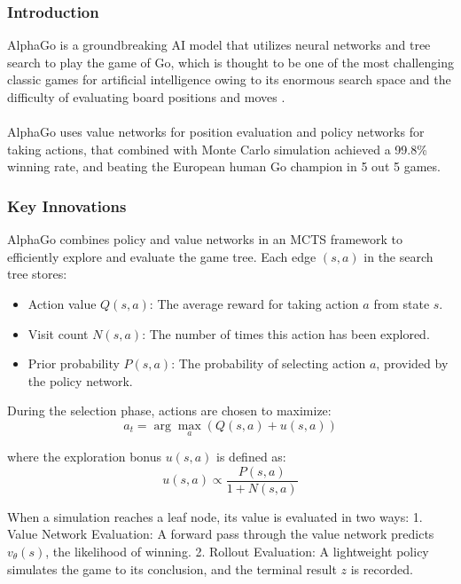 \subsubsection{Introduction}
AlphaGo is a groundbreaking AI model that utilizes neural networks and tree
search to play the game of Go, which is thought to be one of the most
challenging classic games for artificial intelligence owing to its enormous
search space and the difficulty of evaluating board positions and moves
\cite{Silver2016}. \\\\ AlphaGo uses value networks for position evaluation and
policy networks for taking actions, that combined with Monte Carlo simulation
achieved a 99.8\% winning rate, and beating the European human Go champion in 5
out 5 games.

\subsubsection{Key Innovations}

AlphaGo combines policy and value networks in an MCTS framework to efficiently explore and evaluate the game tree. Each edge \( (s, a) \) in the search tree stores:
\begin{itemize}
    \item Action value \( Q(s, a) \): The average reward for taking action \( a \) from
          state \( s \).
    \item Visit count \( N(s, a) \): The number of times this action has been explored.
    \item Prior probability \( P(s, a) \): The probability of selecting action \( a \),
          provided by the policy network.
\end{itemize}

During the selection phase, actions are chosen to maximize:
\begin{equation}
    a_t = \arg\max_a \left( Q(s, a) + u(s, a) \right)
\end{equation}

where the exploration bonus \( u(s, a) \) is defined as:
\begin{equation}
    u(s, a) \propto \frac{P(s, a)}{1 + N(s, a)}
\end{equation}

When a simulation reaches a leaf node, its value is evaluated in two ways: 1.
Value Network Evaluation: A forward pass through the value network predicts \(
v_\theta(s) \), the likelihood of winning. 2. Rollout Evaluation: A lightweight
policy simulates the game to its conclusion, and the terminal result \( z \) is
recorded.

